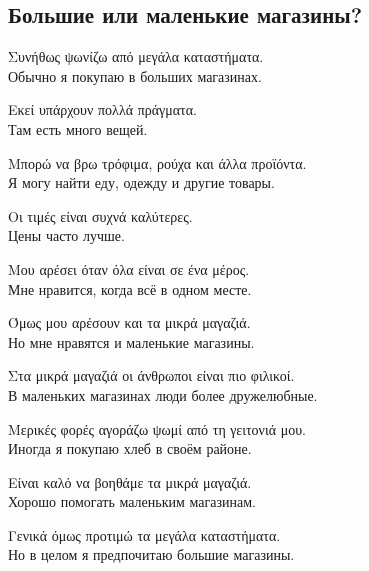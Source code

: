 \documentclass[12pt]{article}
\newcommand{\my}[1]{\textcolor{gray!80!white}{#1}}
\newenvironment{page}{\clearpage\normalsize\null\vfill}{\vfill\null}
\newenvironment{textblock}{\begin{minipage}{\textwidth}}{\end{minipage}\smallskip}
\begin{document}
	\begin{page}
		\subsection{Большие или маленькие магазины?}
		\small
		\begin{textblock}
			Συνήθως ψωνίζω από μεγάλα καταστήματα.\\
			\my{Обычно я покупаю в больших магазинах.}
			
			Εκεί υπάρχουν πολλά πράγματα.\\
			\my{Там есть много вещей.}
			
			Μπορώ να βρω τρόφιμα, ρούχα και άλλα προϊόντα.\\
			\my{Я могу найти еду, одежду и другие товары.}
			
			Οι τιμές είναι συχνά καλύτερες.\\
			\my{Цены часто лучше.}
			
			Μου αρέσει όταν όλα είναι σε ένα μέρος.\\
			\my{Мне нравится, когда всё в одном месте.}
			
			Όμως μου αρέσουν και τα μικρά μαγαζιά.\\
			\my{Но мне нравятся и маленькие магазины.}
			
			Στα μικρά μαγαζιά οι άνθρωποι είναι πιο φιλικοί.\\
			\my{В маленьких магазинах люди более дружелюбные.}
			
			Μερικές φορές αγοράζω ψωμί από τη γειτονιά μου.\\
			\my{Иногда я покупаю хлеб в своём районе.}
			
			Είναι καλό να βοηθάμε τα μικρά μαγαζιά.\\
			\my{Хорошо помогать маленьким магазинам.}
			
			Γενικά όμως προτιμώ τα μεγάλα καταστήματα.\\
			\my{Но в целом я предпочитаю большие магазины.}
		\end{textblock}
	\end{page}
	
\end{document}
